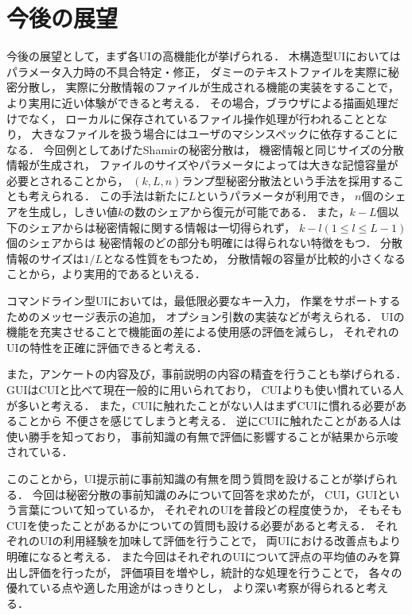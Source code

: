 \documentclass[fleqn, uplatex]{jsarticle}
\begin{document}
\section{今後の展望}
今後の展望として，まず各UIの高機能化が挙げられる．%
木構造型UIにおいてはパラメータ入力時の不具合特定・修正，%
ダミーのテキストファイルを実際に秘密分散し，%
実際に分散情報のファイルが生成される機能の実装をすることで，%
より実用に近い体験ができると考える．%
その場合，ブラウザによる描画処理だけでなく，%
ローカルに保存されているファイル操作処理が行われることとなり，%
大きなファイルを扱う場合にはユーザのマシンスペックに依存することになる．%
今回例としてあげたShamirの秘密分散は，%
機密情報と同じサイズの分散情報が生成され，%
ファイルのサイズやパラメータによっては大きな記憶容量が必要とされることから，%
$(k, L, n)$ランプ型秘密分散法という手法を採用することも考えられる．%
この手法は新たに$L$というパラメータが利用でき，%
$n$個のシェアを生成し，しきい値$k$の数のシェアから復元が可能である．%
また，$k - L$個以下のシェアからは秘密情報に関する情報は一切得られず，%
$k - l(1{\leq}l{\leq}L-1)$個のシェアからは%
秘密情報のどの部分も明確には得られない特徴をもつ．%
分散情報のサイズは$1/L$となる性質をもつため，%
分散情報の容量が比較的小さくなることから，より実用的であるといえる．%

コマンドライン型UIにおいては，最低限必要なキー入力，%
作業をサポートするためのメッセージ表示の追加，%
オプション引数の実装などが考えられる．%
UIの機能を充実させることで機能面の差による使用感の評価を減らし，%
それぞれのUIの特性を正確に評価できると考える．

また，アンケートの内容及び，事前説明の内容の精査を行うことも挙げられる．%
GUIはCUIと比べて現在一般的に用いられており，%
CUIよりも使い慣れている人が多いと考える．%
また，CUIに触れたことがない人はまずCUIに慣れる必要があることから%
不便さを感じてしまうと考える．%
逆にCUIに触れたことがある人は使い勝手を知っており，%
事前知識の有無で評価に影響することが結果から示唆されている．

このことから，UI提示前に事前知識の有無を問う質問を設けることが挙げられる．%
今回は秘密分散の事前知識のみについて回答を求めたが，%
CUI，GUIという言葉について知っているか，%
それぞれのUIを普段どの程度使うか，%
そもそもCUIを使ったことがあるかについての質問も設ける必要があると考える．%
それぞれのUIの利用経験を加味して評価を行うことで，%
両UIにおける改善点もより明確になると考える．%
また今回はそれぞれのUIについて評点の平均値のみを算出し評価を行ったが，%
評価項目を増やし，統計的な処理を行うことで，%
各々の優れている点や適した用途がはっきりとし，%
より深い考察が得られると考える．
\end{document}
